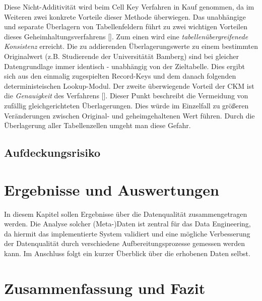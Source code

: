 Diese Nicht-Additivität wird beim Cell Key Verfahren in Kauf genommen, da im Weiteren zwei konkrete Vorteile dieser Methode überwiegen. Das unabhängige und separate Überlagern von Tabellenfeldern führt zu zwei wichtigen Vorteilen dieses Geheimhaltungsverfahrens [\cite{Enderle}]. Zum einen wird eine \textit{tabellenübergreifenede Konsistenz} erreicht. Die zu addierenden Überlagerungswerte zu einem bestimmten Originalwert (z.B. Studierende der Universitätät Bamberg) sind bei gleicher Datengrundlage immer identisch - unabhängig von der Zieltabelle. Dies ergibt sich aus den einmalig zugespielten Record-Keys und dem danach folgenden deterministeischen Lookup-Modul. Der zweite überwiegende Vorteil der CKM ist die \textit{Genauigkeit} des Verfahrens [\cite{Enderle}]. Dieser Punkt beschreibt die Vermeidung von zufällig gleichgerichteten Überlagerungen. Dies würde im Einzelfall zu grö\ss eren Veränderungen zwischen Original- und geheimgehaltenen Wert führen. Durch die Überlagerung aller Tabellenzellen umgeht man diese Gefahr.

\subsection{Aufdeckungsrisiko}



\section{Ergebnisse und Auswertungen}

In diesem Kapitel sollen Ergebnisse über die Datenqualität zusammengetragen werden. Die Analyse solcher (Meta-)Daten ist zentral für das Data Engineering, da hiermit das implementierte System validiert und eine mögliche Verbesserung der Datenqualität durch verschiedene Aufbereitungsprozesse gemessen werden kann. Im Anschluss folgt ein kurzer Überblick über die erhobenen Daten selbst.



\section{Zusammenfassung und Fazit}

